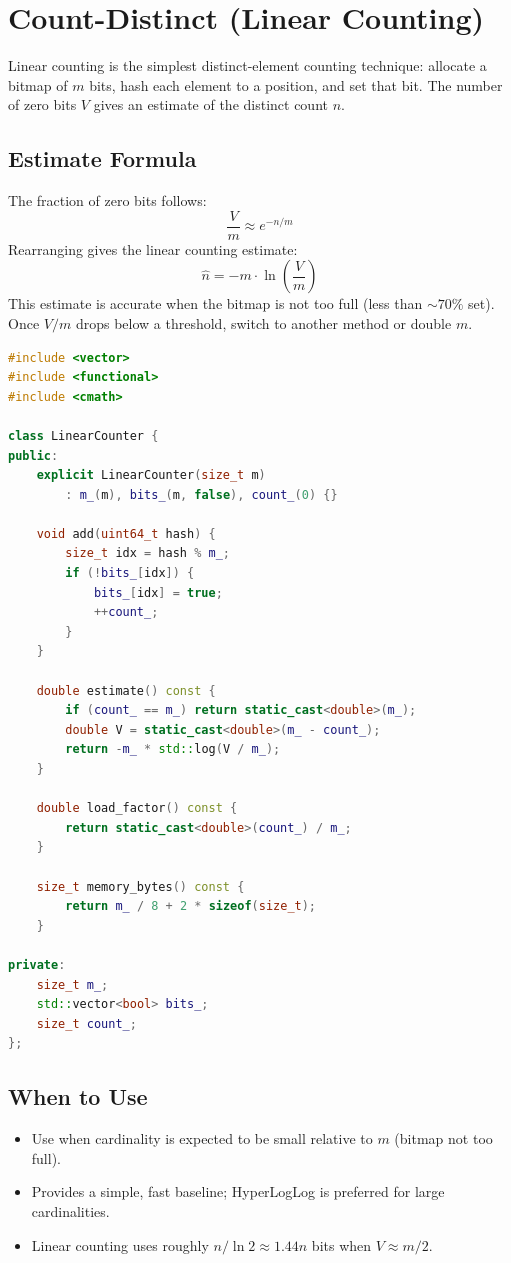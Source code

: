 \section{Count-Distinct (Linear Counting)}

Linear counting is the simplest distinct-element counting technique: allocate a bitmap of $m$ bits, hash each element to a position, and set that bit. The number of zero bits $V$ gives an estimate of the distinct count $n$.

\subsection{Estimate Formula}

The fraction of zero bits follows:
\[
\frac{V}{m} \approx e^{-n/m}
\]
Rearranging gives the linear counting estimate:
\[
\hat{n} = -m \cdot \ln\left(\frac{V}{m}\right)
\]
This estimate is accurate when the bitmap is not too full (less than $\sim 70\%$ set). Once $V / m$ drops below a threshold, switch to another method or double $m$.

\begin{lstlisting}[language=C++, caption={Linear counting for distinct elements}]
#include <vector>
#include <functional>
#include <cmath>

class LinearCounter {
public:
    explicit LinearCounter(size_t m)
        : m_(m), bits_(m, false), count_(0) {}

    void add(uint64_t hash) {
        size_t idx = hash % m_;
        if (!bits_[idx]) {
            bits_[idx] = true;
            ++count_;
        }
    }

    double estimate() const {
        if (count_ == m_) return static_cast<double>(m_);
        double V = static_cast<double>(m_ - count_);
        return -m_ * std::log(V / m_);
    }

    double load_factor() const {
        return static_cast<double>(count_) / m_;
    }

    size_t memory_bytes() const {
        return m_ / 8 + 2 * sizeof(size_t);
    }

private:
    size_t m_;
    std::vector<bool> bits_;
    size_t count_;
};
\end{lstlisting}

\subsection{When to Use}

\begin{itemize}
    \item Use when cardinality is expected to be small relative to $m$ (bitmap not too full).
    \item Provides a simple, fast baseline; HyperLogLog is preferred for large cardinalities.
    \item Linear counting uses roughly $n / \ln 2 \approx 1.44n$ bits when $V \approx m / 2$.
\end{itemize}

